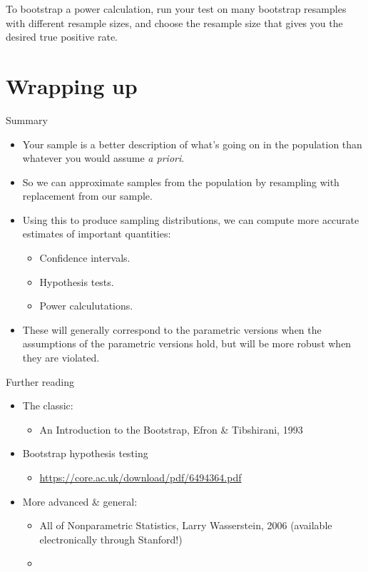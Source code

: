 \documentclass{beamer} %
\begin{document}
\begin{frame}[standout]
To bootstrap a power calculation, run your test on many bootstrap resamples with different resample sizes, and choose the resample size that gives you the desired true positive rate.
\end{frame}


\section{Wrapping up}

\begin{frame}{Summary}
\begin{itemize}
\item Your sample is a better description of what's going on in the population than whatever you would assume \textit{a priori}.
\item So we can approximate samples from the population by resampling with replacement from our sample.
\item Using this to produce sampling distributions, we can compute more accurate estimates of important quantities:
    \begin{itemize}
    \item Confidence intervals.
    \item Hypothesis tests.
    \item Power calculutations.
    \end{itemize}
\item These will generally correspond to the parametric versions when the assumptions of the parametric versions hold, but will be more robust when they are violated.
\end{itemize}
\end{frame}

\begin{frame}{Further reading}
\begin{itemize}
\item The classic:
    \begin{itemize}
    \item An Introduction to the Bootstrap, Efron \& Tibshirani, 1993
    \end{itemize}
\item Bootstrap hypothesis testing 
    \begin{itemize}
    \item \url{https://core.ac.uk/download/pdf/6494364.pdf} 
    \end{itemize}
\item More advanced \& general: 
    \begin{itemize}
    \item All of Nonparametric Statistics, Larry Wasserstein, 2006 (available electronically through Stanford!)
    \item 
    \end{itemize}
\end{itemize}
\end{frame}
\end{document}
